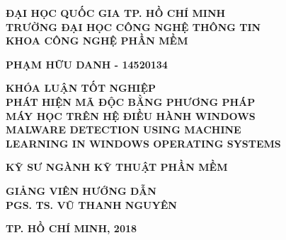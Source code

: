 \begin{titlepage}


\thisfancypage{
    \setlength{\fboxsep}{15pt}
    \doublebox
}{}

\begin{center}

\textbf{\large {ĐẠI HỌC QUỐC GIA TP. HỒ CHÍ MINH}} \\
[2mm]
\textbf{\Large {TRƯỜNG ĐẠI HỌC CÔNG NGHỆ THÔNG TIN}} \\ 
[2mm]
\textbf{\Large {KHOA CÔNG NGHỆ PHẦN MỀM}}

\vspace{0.07\textheight}
\textbf{\large PHẠM HỮU DANH - 14520134}

\vspace{0.1\textheight}
\textbf{\Large KHÓA LUẬN TỐT NGHIỆP} \\ [10mm]


\textbf{\Large PHÁT HIỆN MÃ ĐỘC BẰNG PHƯƠNG PHÁP } \\ 
[2mm]
\textbf{\Large MÁY HỌC TRÊN HỆ ĐIỀU HÀNH WINDOWS } \\ 
[10mm]
\textbf{ \Large MALWARE DETECTION USING MACHINE } \\ 
[2mm]
\textbf{ \Large LEARNING IN WINDOWS OPERATING SYSTEMS }

\vspace{0.1\textheight}
\textbf{\large KỸ SƯ NGÀNH KỸ THUẬT PHẦN MỀM}

\vspace{0.07\textheight}
\textbf{\large GIẢNG VIÊN HƯỚNG DẪN} \\ 
[2mm]
\textbf{\large PGS. TS. VŨ THANH NGUYÊN}

\vspace{\fill}
\textbf{\large TP. HỒ CHÍ MINH, 2018}

\end{center}
\end{titlepage}
\cleardoublepage
